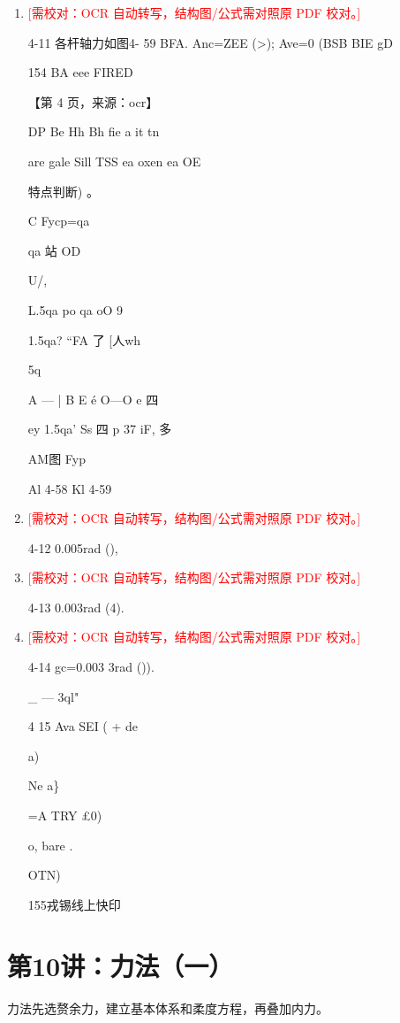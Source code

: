 \documentclass[UTF8,12pt,a4paper,openany]{ctexbook}
\newcommand{\TODO}[1]{\textcolor{red}{[需校对：#1]}}
\begin{document}
\begin{enumerate}[label=\textbf{\arabic*.},leftmargin=2em]
\item \TODO{OCR 自动转写，结构图/公式需对照原 PDF 校对。}\par 4-11 各杆轴力如图4- 59 BFA. Anc=ZEE (>); Ave=0  (BSB BIE gD\par 154                                                     BA eee FIRED\par \par 【第 4 页，来源：ocr】\par DP Be Hh Bh fie a it tn\par are gale Sill TSS ea oxen ea OE\par 特点判断) 。\par C Fycp=qa\par qa 站        OD\par U/,\par L.5qa    po   qa                       oO 9\par 1.5qa?                            “FA 了 [人wh\par 5q\par A — | B    E é           O—O          e          四\par ey  1.5qa’  Ss              四               p     37      iF,    多\par AM图                                   Fyp\par Al 4-58                                   Kl 4-59
\item \TODO{OCR 自动转写，结构图/公式需对照原 PDF 校对。}\par 4-12 0.005rad (),
\item \TODO{OCR 自动转写，结构图/公式需对照原 PDF 校对。}\par 4-13 0.003rad (4).
\item \TODO{OCR 自动转写，结构图/公式需对照原 PDF 校对。}\par 4-14 gc=0.003 3rad ()).\par \_        — 3ql"\par 4   15   Ava   SEI  ( + de\par a)\par Ne    a\}\par =A TRY £0)\par o, bare .\par OTN)\par 155戎锡线上快印
\end{enumerate}
\chapter{第10讲：力法（一）}
\begin{tcolorbox}[title=解析总览]
力法先选赘余力，建立基本体系和柔度方程，再叠加内力。
\end{tcolorbox}
\end{document}
